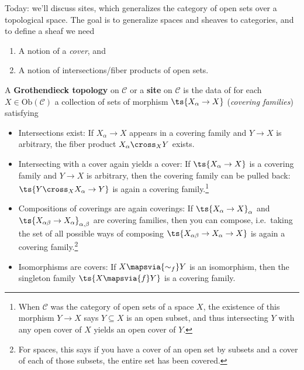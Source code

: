 Today: we'll discuss sites, which generalizes the category of open sets
over a topological space. The goal is to generalize spaces and sheaves
to categories, and to define a sheaf we need

\begin{enumerate}
\def\labelenumi{\arabic{enumi}.}
\item
  A notion of a \emph{cover}, and
\item
  A notion of intersections/fiber products of open sets.
\end{enumerate}

\begin{definition}

A \textbf{Grothendieck topology} on \(\mathcal{C}\) or a \textbf{site}
on \(\mathcal{C}\) is the data of for each
\(X\in \mathrm{Ob}(\mathcal{C})\) a collection of sets of morphism
\(\ts{X_\alpha \to X}\) (\emph{covering families}) satisfying

\begin{itemize}
\item
  Intersections exist: If \(X_\alpha\to X\) appears in a covering family
  and \(Y\to X\) is arbitrary, the fiber product \(X_\alpha\cross_X Y\)
  exists.
\item
  Intersecting with a cover again yields a cover: If
  \(\ts{X_\alpha\to X}\) is a covering family and \(Y\to X\) is
  arbitrary, then the covering family can be pulled back:
  \(\ts{Y\cross_X X_\alpha\to Y}\) is again a covering
  family.\footnote{When \(\mathcal{C}\) was the category of open sets of
    a space \(X\), the existence of this morphism \(Y\to X\) says
    \(Y \subseteq X\) is an open subset, and thus intersecting \(Y\)
    with any open cover of \(X\) yields an open cover of \(Y\).}
\item
  Compositions of coverings are again coverings: If
  \(\ts{X_\alpha\to X}_{\alpha}\) and
  \(\ts{X_{\alpha\beta} \to X_\alpha}_{\alpha,\beta}\) are covering
  families, then you can compose, i.e.~taking the set of all possible
  ways of composing \(\ts{X_{\alpha\beta} \to X_\alpha \to X}\) is again
  a covering family.\footnote{For spaces, this says if you have a cover
    of an open set by subsets and a cover of each of those subsets, the
    entire set has been covered.}
\item
  Isomorphisms are covers: If \(X\mapsvia{\sim_f} Y\) is an isomorphism,
  then the singleton family \(\ts{X\mapsvia{f} Y}\) is a covering
  family.
\end{itemize}

\end{definition}

